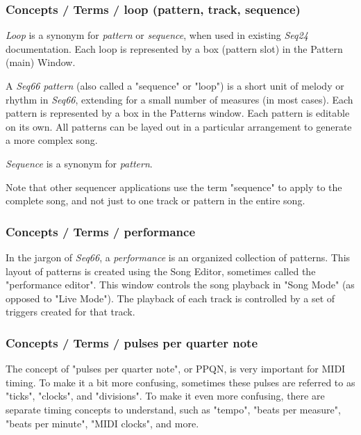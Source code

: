 \subsubsection{Concepts / Terms / loop (pattern, track, sequence)}
\label{subsubsec:concepts_terms_loop}

   \textsl{Loop}
   is a synonym for \textsl{pattern} or \textsl{sequence}, when used
   in existing \textsl{Seq24} documentation.
   Each loop is represented by a box (pattern slot) in the Pattern (main)
   Window.

   A \textsl{Seq66} \textsl{pattern}
   (also called a "sequence" or "loop")
   is a short unit of melody or rhythm in \textsl{Seq66},
   extending for a small number of measures (in most cases).
   Each pattern is represented by a box in the Patterns window.
   Each pattern is editable on its own.  All patterns can be layed out in
   a particular arrangement to generate a more complex song.

   \textsl{Sequence} is
   a synonym for \textsl{pattern}.

   Note that other sequencer applications use the term "sequence"
   to apply to the complete song, and not just to one track or pattern in the
   entire song.

\subsubsection{Concepts / Terms / performance}
\label{subsubsec:concepts_terms_performance}

   In the jargon of \textsl{Seq66}, a
   \textsl{performance} is an organized collection of patterns.
   This layout of patterns is created using the Song Editor, sometimes
   called the "performance editor".
   This window controls the song playback in "Song Mode" (as opposed to "Live
   Mode").
   The playback of each track is controlled by a set of triggers created for
   that track.

\subsubsection{Concepts / Terms / pulses per quarter note}
\label{subsubsec:concepts_terms_pulses}

   The concept of "pulses per quarter note", or PPQN, is very important for
   MIDI timing.  To make it a bit more confusing, sometimes these pulses are
   referred to as "ticks", "clocks", and "divisions".
   To make it even more confusing, there are separate timing concepts to
   understand, such as "tempo", "beats per measure", "beats per minute",
   "MIDI clocks", and more.

